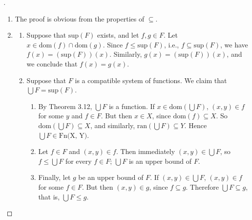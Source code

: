 \documentclass[a4paper,11pt]{article}
\theoremstyle{definition}
\newenvironment{proofbreak}[1][\proofname]{%
  \begin{proof}[#1]$ $\par\nobreak\ignorespaces
}{%
  \end{proof}
}
\begin{document}
\begin{proofbreak}
  \begin{enumerate}
  \item The proof is obvious from the properties of \(\subseteq\).
  \item
    \begin{enumerate}
    \item Suppose that \(\text{sup}(F)\) exists, and let \(f, g \in F\). Let
      \(x \in \text{dom}(f) \cap \text{dom}(g)\). Since \(f \le \text{sup}(F)\), i.e.,
      \(f \subseteq \text{sup}(F)\), we have \(f(x) = (\text{sup}(F))(x)\). Similarly,
      \(g(x) = (\text{sup}(F))(x)\), and we conclude that \(f(x) = g(x)\).
    \item Suppose that \(F\) is a compatible system of functions. We claim that
      \(\bigcup F = \text{sup}(F)\).

      \begin{enumerate}
      \item By Theorem 3.12, \(\bigcup F\) is a function. If
        \(x \in \text{dom}(\bigcup F)\), \((x, y) \in f\) for some \(y\) and
        \(f \in F\). But then \(x \in X\), since \(\text{dom}(f) \subseteq X\). So
        \(\text{dom}(\bigcup F) \subseteq X\), and similarly,
        \(\text{ran}(\bigcup F) \subseteq Y\). Hence \(\bigcup F \in \text{Fn(X, Y)}\).
      \item Let \(f \in F\) and \((x, y) \in f\). Then immediately
        \((x, y) \in \bigcup F\), so \(f \le \bigcup F\) for every \(f \in F\);
        \(\bigcup F\) is an upper bound of \(F\).
      \item Finally, let \(g\) be an upper bound of \(F\). If
        \((x, y) \in \bigcup F\), \((x, y) \in f\) for some \(f \in F\). But then
        \((x, y) \in g\), since \(f \subseteq g\). Therefore
        \(\bigcup F \subseteq g\), that is, \(\bigcup F \le g\).
      \end{enumerate}
    \end{enumerate}
  \end{enumerate}
\end{proofbreak}
\end{document}
